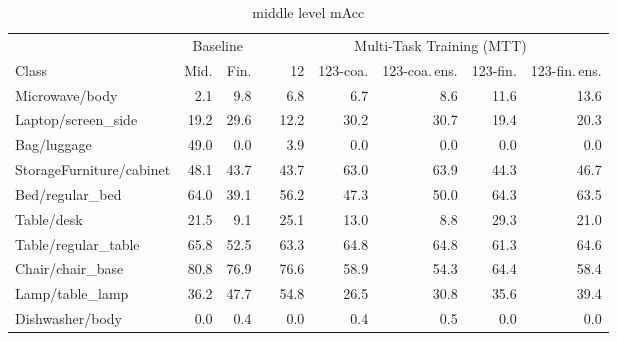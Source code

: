
\begin{table}[!h]

\caption{middle level mAcc}
\centering
\begin{tabular}{lrrrrrrrr}
\toprule
 &  \multicolumn{2}{c}{Baseline} && \multicolumn{5}{c}{Multi-Task Training (MTT)} \\
 \cmidrule{2-3}
 \cmidrule{5-9}
Class 			  &  	 Mid. &  				Fin. &&  	12 &  		123-coa. &  		123-coa.\,ens. &  	  123-fin. &  123-fin.\,ens. \\
\midrule
Microwave/body           &              2.1 &                  9.8 &&     6.8 &             6.7 &                     8.6 &          11.6 &                  13.6 \\
Laptop/screen\_side       &             19.2 &                 29.6 &&    12.2 &            30.2 &                    30.7 &          19.4 &                  20.3 \\
Bag/luggage              &             49.0 &                  0.0 &&     3.9 &             0.0 &                     0.0 &           0.0 &                   0.0 \\
StorageFurniture/cabinet &             48.1 &                 43.7 &&    43.7 &            63.0 &                    63.9 &          44.3 &                  46.7 \\
Bed/regular\_bed          &             64.0 &                 39.1 &&    56.2 &            47.3 &                    50.0 &          64.3 &                  63.5 \\
Table/desk               &             21.5 &                  9.1 &&    25.1 &            13.0 &                     8.8 &          29.3 &                  21.0 \\
Table/regular\_table      &             65.8 &                 52.5 &&    63.3 &            64.8 &                    64.8 &          61.3 &                  64.6 \\
Chair/chair\_base         &             80.8 &                 76.9 &&    76.6 &            58.9 &                    54.3 &          64.4 &                  58.4 \\
Lamp/table\_lamp          &             36.2 &                 47.7 &&    54.8 &            26.5 &                    30.8 &          35.6 &                  39.4 \\
Dishwasher/body          &              0.0 &                  0.4 &&     0.0 &             0.4 &                     0.5 &           0.0 &                   0.0 \\

\end{tabular}
\end{table}
